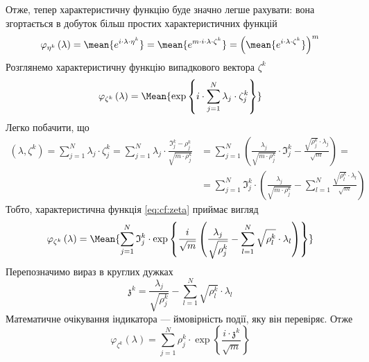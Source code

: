 Отже, тепер характеристичну функцію буде значно легше рахувати: вона згортається
в добуток більш простих характеристичних функцій
\begin{equation}\label{eq:cf:eta}
  \varphi_{\eta^k}\left( \lambda\right)
  = \mean{e^{i \cdot \lambda \cdot \eta^k}}
  = \mean{e^{m \cdot i \cdot \lambda \cdot \zeta^k}}
  = \left( \mean{e^{i \cdot \lambda \cdot \zeta^k}} \right)^m
\end{equation}
Розглянемо характеристичну функцію випадкового вектора $\zeta^k$
\begin{equation}\label{eq:cf:zeta}
  \varphi_{\zeta^k}\left( \lambda \right)
  = \Mean{\exp{\left\{ i
    \cdot \sum_{j=1}^{N} \lambda_j \cdot \zeta_j^k \right\}}}
\end{equation}
Легко побачити, що
\begin{equation*}
  \begin{split}
    \left( \lambda, \zeta^k \right)
    = \sum_{j=1}^{N} \lambda_j \cdot \zeta_j^k
    = \sum_{j=1}^{N} \lambda_j
      \cdot \frac{\mathfrak{I}_j^k - \rho_j^k}{\sqrt{m \cdot \rho_j^k}}
    &= \sum_{j=1}^{N} \left(
       \frac{\lambda_j}{\sqrt{m \cdot \rho_j^k}} \cdot \mathfrak{I}_j^k
       - \frac{\sqrt{\rho_j^k} \cdot \lambda_j}{\sqrt{m}} \right) = \\
    &= \sum_{j=1}^{N} \mathfrak{I}_j^k \cdot \left( 
        \frac{\lambda_j}{\sqrt{m \cdot \rho_j^k}}
        - \sum_{l=1}^{N} \frac{\sqrt{\rho_l^k} \cdot \lambda_l}{\sqrt{m}}
      \right)
  \end{split}
\end{equation*}
Тобто, характеристична функція \eqref{eq:cf:zeta} приймає вигляд
\begin{equation*}
  \varphi_{\zeta^k}\left( \lambda \right)
  = \Mean{\sum_{j=1}^{N} \mathfrak{I}_j^k
    \cdot \exp{\left\{ \frac{i}{\sqrt{m}} \left(
      \frac{\lambda_j}{\sqrt{\rho_j^k}}
      - \sum_{l=1}^{N} \sqrt{\rho_l^k} \cdot \lambda_l \right) \right\}}}
\end{equation*}
Перепозначимо вираз в круглих дужках
\begin{equation*}
  \mathfrak{z}^k
  = \frac{\lambda_j}{\sqrt{\rho_j^k}}
    - \sum_{l=1}^{N} \sqrt{\rho_l^k} \cdot \lambda_l
\end{equation*}
Математичне очікування індикатора --- ймовірність події, яку він перевіряє.
Отже
\begin{equation*}
  \varphi_{\zeta^k}\left( \lambda \right)
  = \sum_{j=1}^{N} \rho_j^k
    \cdot \exp{\left\{ \frac{i \cdot \mathfrak{z}^k}{\sqrt{m}} \right\}}
\end{equation*}

